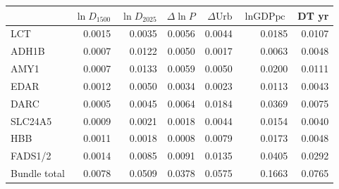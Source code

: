 \begin{tabular}{lrrrrrr}
\toprule
 & $\ln\!D_{1500}$ & $\ln\!D_{2025}$ & $\Delta\!\ln\!P$ & $\Delta\text{Urb}$ & $\ln\!\text{GDPpc}$ & DT yr \\
\midrule
LCT & 0.0015 & 0.0035 & 0.0056 & 0.0044 & 0.0185 & 0.0107 \\
ADH1B & 0.0007 & 0.0122 & 0.0050 & 0.0017 & 0.0063 & 0.0048 \\
AMY1 & 0.0007 & 0.0133 & 0.0059 & 0.0050 & 0.0200 & 0.0111 \\
EDAR & 0.0012 & 0.0050 & 0.0034 & 0.0023 & 0.0113 & 0.0043 \\
DARC & 0.0005 & 0.0045 & 0.0064 & 0.0184 & 0.0369 & 0.0075 \\
SLC24A5 & 0.0009 & 0.0021 & 0.0018 & 0.0044 & 0.0154 & 0.0040 \\
HBB & 0.0011 & 0.0018 & 0.0008 & 0.0079 & 0.0173 & 0.0048 \\
FADS1/2 & 0.0014 & 0.0085 & 0.0091 & 0.0135 & 0.0405 & 0.0292 \\
\midrule
Bundle total & 0.0078 & 0.0509 & 0.0378 & 0.0575 & 0.1663 & 0.0765 \\
\bottomrule
\end{tabular}
